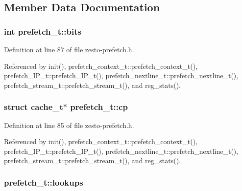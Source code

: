 \subsection{Member Data Documentation}
\subsubsection[{bits}]{\setlength{\rightskip}{0pt plus 5cm}int {\bf prefetch\_\-t::bits}\hspace{0.3cm}{\tt  [protected]}}\label{classprefetch__t_a001179693334a34373e18033af99d06}




Definition at line 87 of file zesto-prefetch.h.

Referenced by init(), prefetch\_\-context\_\-t::prefetch\_\-context\_\-t(), prefetch\_\-IP\_\-t::prefetch\_\-IP\_\-t(), prefetch\_\-nextline\_\-t::prefetch\_\-nextline\_\-t(), prefetch\_\-stream\_\-t::prefetch\_\-stream\_\-t(), and reg\_\-stats().
\subsubsection[{cp}]{\setlength{\rightskip}{0pt plus 5cm}struct {\bf cache\_\-t}$\ast$ {\bf prefetch\_\-t::cp}\hspace{0.3cm}{\tt  [read, protected]}}\label{classprefetch__t_dd006212c8953054b686c7370ee8f8ec}




Definition at line 85 of file zesto-prefetch.h.

Referenced by init(), prefetch\_\-context\_\-t::prefetch\_\-context\_\-t(), prefetch\_\-IP\_\-t::prefetch\_\-IP\_\-t(), prefetch\_\-nextline\_\-t::prefetch\_\-nextline\_\-t(), prefetch\_\-stream\_\-t::prefetch\_\-stream\_\-t(), and reg\_\-stats().
\subsubsection[{lookups}]{ {\bf prefetch\_\-t::lookups}\hspace{0.3cm}{\tt  [protected]}}\label{classprefetch__t_e28873e1d8241bc8b4af771ecb0bc9ff}




